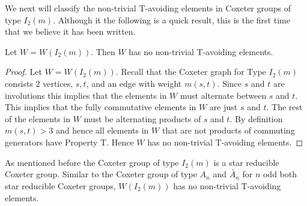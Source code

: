 We next will classify the non-trivial T-avoiding elements in Coxeter groups of type $I_2(m)$. Although it the following is a quick result, this is the first time that we believe it has been written.
\begin{theorem}
Let $W=W(I_2(m))$. Then $W$ has no non-trivial T-avoiding elements.
\begin{proof}
	Let $W=W(I_2(m))$. Recall that the Coxeter graph for Type $I_2(m)$ consists 2 vertices, $s,t$, and an edge with weight $m(s,t)$. Since $s$ and $t$ are involutions this implies that the elements in $W$ must alternate between $s$ and $t$. This implies that the fully commutative elements in $W$ are just $s$ and $t$. The rest of the elements in $W$ must be alternating products of $s$ and $t$. By definition $m(s,t)>3$ and hence all elements in $W$ that are not products of commuting generators have Property T. Hence $W$ has no non-trivial T-avoiding elements. 
\end{proof}	
\end{theorem}
 
As mentioned before the Coxeter group of type $I_2(m)$ is a star reducible Coxeter group. Similar to the Coxeter group of type $A_n$ and $\widetilde{A_n}$ for $n$ odd both star reducible Coxeter groups, $W(I_2(m))$ has no non-trivial T-avoiding elements. 


